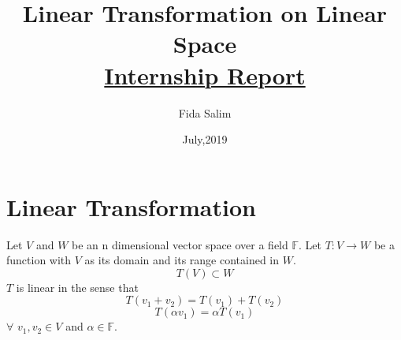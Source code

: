 \documentclass[12pt]{article}
\theoremstyle{definition}
\begin{document}
	\title{\textbf{Linear Transformation on Linear Space} \\
		\large\underline{Internship Report} 
	}
	\author{Fida Salim}
	\date{July,2019}
	\maketitle
	\section{Linear Transformation}
	Let $ V $ and $W $ be an n dimensional vector space over a field $ \mathbb{F} $. Let $ T :V\rightarrow W $ be a function with $ V $ as its domain and its range contained in $ W $. $$ T(V)\subset W $$$ T $ is linear in the sense that $$ T(v_1 + v_2) = T(v_1)+T(v_2) $$ $$ T(\alpha v_1)=\alpha T(v_1)$$ 
	$\forall$ $ v_1,v_2 \in V$ and $\alpha\in\mathbb{F}$.\\
	
\end{document}
